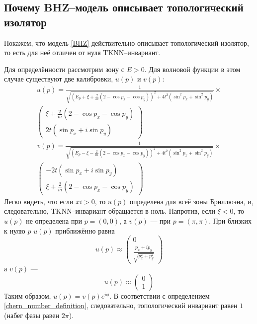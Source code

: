 \subsection{Почему BHZ--модель описывает топологический изолятор}
Покажем, что модель \eqref{BHZ} действительно описывает топологический изолятор, то есть для
неё отличен от нуля TKNN--инвариант. 

Для определённости рассмотрим зону с $E>0$. Для волновой функции в этом случае существуют две
калибровки, $u(p)$ и $v(p)$:
\begin{multline}
    u(p) = \frac{1}{\sqrt{(E_p + \xi + \frac{2}{m}(2 - \cos{p_x} - \cos{p_y}))^2 + 
                        4t^2(\sin^2{p_x} + \sin^2{p_y})}} \times \\
                \begin{pmatrix}
                    \xi + \frac{2}{m}(2 - \cos{p_x} - \cos{p_y}) \\
                    2t(\sin{p_x} + i\sin{p_y})
                \end{pmatrix}
\end{multline}
\begin{multline}
   v(p) = \frac{1}{\sqrt{(E_p - \xi - \frac{2}{m}(2 - \cos{p_x} - \cos{p_y}))^2 + 
                        4t^2(\sin^2{p_x} + \sin^2{p_y})}} \times \\
                \begin{pmatrix}
                    -2t(\sin{p_x} + i\sin{p_y}) \\
                    \xi + \frac{2}{m}(2 - \cos{p_x} - \cos{p_y})
                \end{pmatrix}
\end{multline}
Легко видеть, что если $xi > 0$, то $u(p)$ определена для всеё зоны Бриллюэна, и,
следовательно, TKNN--инвариант обращается в ноль. Напротив, если $\xi < 0$, то
$u(p)$ не определена при $p = (0, 0)$, а $v(p)$ --- при $p = (\pi, \pi)$. При близких 
к нулю $p$ $u(p)$ приближённо равна
\begin{equation}
    u(p) \approx \begin{pmatrix}
                    0 \\
                    \frac{p_x + ip_y}{\sqrt{p_x^2 + p_y^2}}
                 \end{pmatrix}
\end{equation}
а $v(p)$ ---    
\begin{equation}
    u(p) \approx \begin{pmatrix}
                    0 \\
                    1
                 \end{pmatrix}
\end{equation}
Таким образом, $u(p) = v(p) e^{i\phi}$. В соответствии с определением 
\eqref{chern_number_definition}, следовательно, топологический инвариант равен $1$ (набег фазы
равен $2\pi$).
